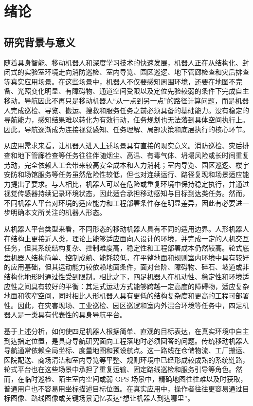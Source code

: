 ﻿%

\chapter{绪论}

\section{研究背景与意义}

随着具身智能、移动机器人和深度学习技术的快速发展，机器人正在从结构化、封闭式的实验室环境走向消防巡检、室内导览、园区巡逻、地下管廊检查和灾后排查等真实应用场景。在这些场景中，机器人不仅要感知周围环境，还要在地图不完备、光照变化明显、有障碍物、通道空间受限以及定位先验较弱的条件下完成自主移动。导航因此不再只是移动机器人“从一点到另一点”的路径计算问题，而是机器人完成巡检、导览、搬运、搜救和服务任务之前必须具备的基础能力。没有稳定的导航能力，感知结果难以转化为有效行动，任务规划也无法落到具体空间执行上。因此，导航逐渐成为连接视觉感知、任务理解、局部决策和底层执行的核心环节\cite{pei2026embodied_nav}。

从应用需求来看，让机器人进入上述场景具有直接的现实意义。消防巡检、灾后排查和地下管廊检查等任务往往伴随烟尘、高温、有毒气体、坍塌风险或长时间重复劳动，完全依赖人工会带来较高安全成本和人力消耗；室内导览、园区巡逻、楼宇安防和场馆服务等任务虽然危险性较低，但也对连续运行、路径复现和场景适应能力提出了要求。与人相比，机器人可以在危险或重复环境中保持稳定执行，并通过视觉传感器持续记录环境状态，因此适合承担移动感知与目标到达类任务。然而，不同机器人平台对环境的适应能力和工程部署条件存在明显差异，因此有必要进一步明确本文所关注的机器人形态。

从机器人平台类型来看，不同形态的移动机器人具有不同的适用边界。人形机器人在结构上更接近人类，理论上能够适应面向人设计的环境，并完成一定的人机交互任务，但其系统结构复杂、控制难度高，稳定性和工程部署成本仍然较高。轮式底盘机器人结构简单、控制成熟、能耗较低，在平整地面和规则室内环境中具有较好的应用基础，但其运动能力较依赖地面条件，面对台阶、障碍物、碎石、坡道或非结构化地形时通过性受到限制。相比之下，四足机器人在机动性、稳定性和环境适应性之间具有较好的平衡：其足式运动方式能够跨越一定高度的障碍物，适应复杂地面和狭窄空间，同时相比人形机器人具有更低的结构复杂度和更高的工程可部署性。因此，在灾害现场、工业巡检、园区巡逻和室内外混合环境等任务中，四足机器人是一类具有代表性的具身导航平台\cite{yang2019quadruped_review,hwangbo2019anymal,lee2020learning}。

基于上述分析，如何使四足机器人根据简单、直观的目标表达，在真实环境中自主到达指定位置，是具身导航研究面向工程落地时必须回答的问题。传统移动机器人导航通常依赖全局坐标、度量地图和预设航点。这一路线在仓储物流、工厂搬运、医院配送、商场清洁和室内导览等平整、规则环境中已经形成较成熟的系统链路，轮式平台也在这些场景中承担了重复运输、固定路线巡检和服务引导等角色。然而，在临时巡检、陌生室内空间或弱 GPS 场景中，精确地图往往难以及时获取，普通用户也不容易用坐标描述目标位置。在真实应用中，操作者往往更容易通过目标图像、路线图像或关键场景记忆表达“想让机器人到达哪里”。

